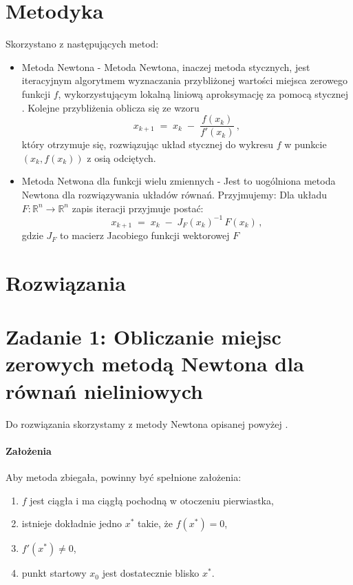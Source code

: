 \documentclass[a4paper,12pt]{article}
\begin{document}
    \section{Metodyka}
    
    Skorzystano z następujących metod:
    \begin{itemize}
        \item Metoda Newtona - Metoda Newtona, inaczej metoda stycznych, jest iteracyjnym algorytmem wyznaczania przybliżonej wartości miejsca zerowego funkcji \(f\), wykorzystującym lokalną liniową aproksymację za pomocą stycznej \cite{wiki:Metoda_Newtona}. Kolejne przybliżenia oblicza się ze wzoru
    \[
      x_{k+1} \;=\; x_k \;-\;\frac{f(x_k)}{f'(x_k)}\,,
    \]
    który otrzymuje się, rozwiązując układ stycznej do wykresu \(f\) w punkcie \((x_k,f(x_k))\) z osią odciętych.
        \item Metoda Netwona dla funkcji wielu zmiennych - Jest to uogólniona metoda Newtona dla rozwiązywania układów równań. Przyjmujemy:
        Dla układu \(F:\mathbb R^n\to\mathbb R^n\) zapis iteracji przyjmuje postać:
    \[
      x_{k+1} \;=\; x_k \;-\;J_F(x_k)^{-1}\,F(x_k)\,,
    \]
    gdzie \(J_F\) to macierz Jacobiego funkcji wektorowej \(F\) \cite{wiki:Metoda_Newtona}
    
    \end{itemize}
    
    \section{Rozwiązania}
    
    \section*{Zadanie 1: Obliczanie miejsc zerowych metodą Newtona dla równań nieliniowych}
    
    Do rozwiązania skorzystamy z metody Newtona opisanej powyżej \cite{wiki:Metoda_Newtona}. 
    
    \paragraph{Założenia}
    Aby metoda zbiegała, powinny być spełnione założenia:
    \begin{enumerate}
      \item \(f\) jest ciągła i ma ciągłą pochodną w otoczeniu pierwiastka,
      \item istnieje dokładnie jedno \(x^*\) takie, że \(f(x^*)=0\),
      \item \(f'(x^*)\neq0\),
      \item punkt startowy \(x_0\) jest dostatecznie blisko \(x^*\).
    \end{enumerate}
    
\end{document}
